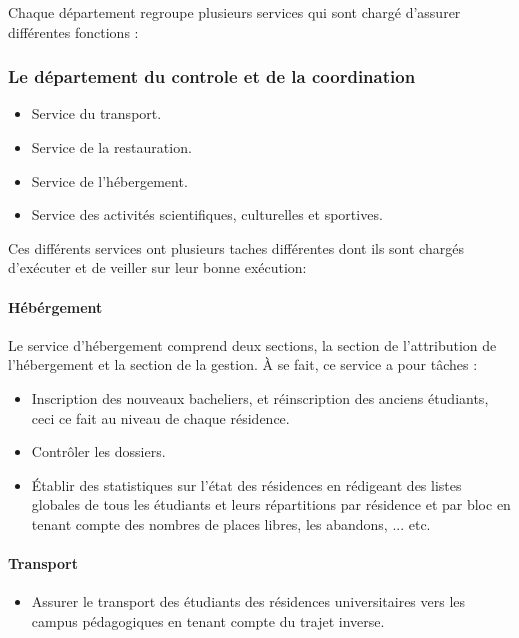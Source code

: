 Chaque département regroupe plusieurs services qui sont chargé d'assurer différentes fonctions :

\subsubsection{Le département du controle et de la coordination}
\begin{itemize}
    \item Service du transport.
    \item Service de la restauration.
    \item Service de l'hébergement.
    \item Service des activités scientifiques, culturelles et sportives.\\
\end{itemize}

Ces différents services ont plusieurs taches différentes dont ils sont chargés d'exécuter et de veiller sur leur bonne exécution:

\paragraph{Hébérgement}
Le service d'hébergement comprend deux sections, la section de l'attribution de l'hébergement et la section de la gestion. À se fait, ce service a pour tâches :

\begin{itemize}
    \item Inscription des nouveaux bacheliers, et réinscription des anciens étudiants, ceci ce fait au niveau de chaque résidence.
    \item Contrôler les dossiers.
    \item Établir des statistiques sur l'état des résidences en rédigeant des listes globales de tous les étudiants et leurs répartitions par résidence et par bloc en tenant compte des nombres de places libres, les abandons, ... etc.
\end{itemize}

\paragraph{Transport}
\begin{itemize}
    \item Assurer le transport des étudiants des résidences universitaires vers les campus pédagogiques en tenant compte du trajet inverse.
\end{itemize}

